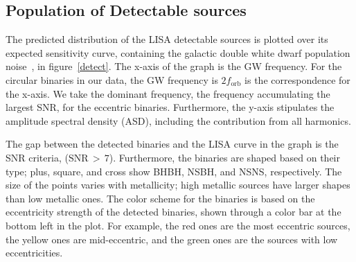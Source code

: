 \documentclass[journal, twocolumn]{IEEEtran}
\begin{document}


%	
%	

    \subsection{Population of Detectable sources} \label{subsec:r11}
    The predicted distribution of the LISA detectable sources is plotted over its expected sensitivity curve, containing the galactic double white dwarf population noise~\cite{Robson2019}, in figure~\ref{detect}.
    The x-axis of the graph is the GW frequency.
    For the circular binaries in our data, the GW frequency is $2f_\text{orb}$ is the correspondence for the x-axis.
    We take the dominant frequency, the frequency accumulating the largest SNR, for the eccentric binaries.
    Furthermore, the y-axis stipulates the amplitude spectral density (ASD), including the contribution from all harmonics.

    The gap between the detected binaries and the LISA curve in the graph is the SNR criteria, ($\text{SNR}\,>\,7$). Furthermore, the binaries are shaped based on their type; plus, square, and cross show BHBH, NSBH, and NSNS, respectively.
    The size of the points varies with metallicity; high metallic sources have larger shapes than low metallic ones.
    The color scheme for the binaries is based on the eccentricity strength of the detected binaries, shown through a color bar at the bottom left in the plot.
    For example, the red ones are the most eccentric sources, the yellow ones are mid-eccentric, and the green ones are the sources with low eccentricities.
\end{document}
